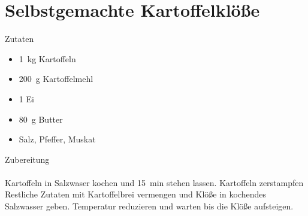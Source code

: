 \section*{Selbstgemachte Kartoffelklöße}
\ihead{}\ohead{}
\cfoot{}
{\Large Zutaten}
\begin{multicols}{2}
\begin{itemize}
    \item \SI{1}{kg} Kartoffeln
    \item \SI{200}{g} Kartoffelmehl
    \item \num{1} Ei
    \item \SI{80}{g} Butter
    \item Salz, Pfeffer, Muskat
\end{itemize}
\end{multicols}
\noindent
{\Large Zubereitung}\\
\\
Kartoffeln in Salzwaser kochen und \SI{15}{min} stehen lassen.
Kartoffeln zerstampfen
Restliche Zutaten mit Kartoffelbrei vermengen und Klöße in kochendes Salzwasser geben.
Temperatur reduzieren und warten bis die Klöße aufsteigen.
